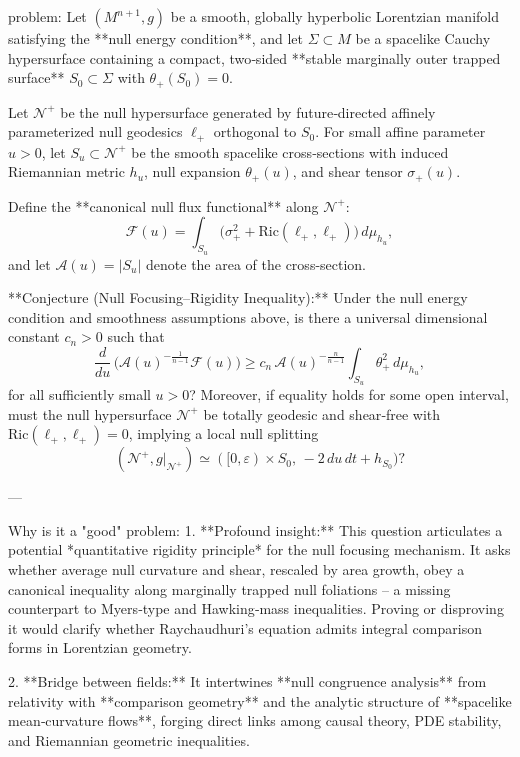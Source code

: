 problem:  
Let \((M^{n+1}, g)\) be a smooth, globally hyperbolic Lorentzian manifold satisfying the **null energy condition**, and let \(\Sigma\subset M\) be a spacelike Cauchy hypersurface containing a compact, two‑sided **stable marginally outer trapped surface** \(S_0\subset\Sigma\) with \(\theta_+(S_0)=0\).  

Let \(\mathcal{N}^+\) be the null hypersurface generated by future‑directed affinely parameterized null geodesics \(\ell_+\) orthogonal to \(S_0\). For small affine parameter \(u>0\), let \(S_u \subset \mathcal N^+\) be the smooth spacelike cross‑sections with induced Riemannian metric \(h_u\), null expansion \(\theta_+(u)\), and shear tensor \(\sigma_+(u)\).  

Define the **canonical null flux functional** along \(\mathcal N^+\):  
\[
\mathcal F(u)=\int_{S_u}\!\!\Big(\sigma_+^2+\mathrm{Ric}(\ell_+,\ell_+)\Big)\,d\mu_{h_u},
\]
and let \(\mathcal A(u)=|S_u|\) denote the area of the cross-section.

**Conjecture (Null Focusing–Rigidity Inequality):**  
Under the null energy condition and smoothness assumptions above, is there a universal dimensional constant \(c_n>0\) such that  
\[
\frac{d}{du}\,\Big(\mathcal A(u)^{-\frac{1}{n-1}}\mathcal F(u)\Big)\ge c_n\,\mathcal A(u)^{-\frac{n}{n-1}}\int_{S_u}\!\theta_+^2\,d\mu_{h_u},
\]
for all sufficiently small \(u>0\)?  Moreover, if equality holds for some open interval, must the null hypersurface \(\mathcal N^+\) be totally geodesic and shear‑free with \(\mathrm{Ric}(\ell_+,\ell_+)=0\), implying a local null splitting  
\[
(\mathcal{N}^+,g|_{\mathcal{N}^+})\simeq ([0,\varepsilon)\times S_0,\,-2\,du\,dt + h_{S_0})?
\]

---

Why is it a "good" problem:  
1. **Profound insight:**  
This question articulates a potential *quantitative rigidity principle* for the null focusing mechanism.  It asks whether average null curvature and shear, rescaled by area growth, obey a canonical inequality along marginally trapped null foliations – a missing counterpart to Myers‑type and Hawking‑mass inequalities.  Proving or disproving it would clarify whether Raychaudhuri’s equation admits integral comparison forms in Lorentzian geometry.

2. **Bridge between fields:**  
It intertwines **null congruence analysis** from relativity with **comparison geometry** and the analytic structure of **spacelike mean‑curvature flows**, forging direct links among causal theory, PDE stability, and Riemannian geometric inequalities.


